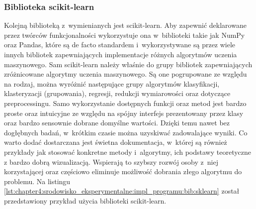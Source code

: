 \documentclass[../Kamil_Kowalewski_Main.tex]{subfiles}
\begin{document}
{{{            \subsubsection{Biblioteka scikit-learn}
            \label{chapter4:srodowisko_eksperymentalne:impl_programu:bib:sklearn} {
                Kolejną biblioteką z~wymienianych jest scikit-learn\cite{website:sklearn}.
                Aby zapewnić deklarowane przez twórców funkcjonalności wykorzystuje ona
                w~biblioteki takie jak NumPy oraz Pandas, które są de facto standardem
                i~wykorzystywane są przez wiele innych bibliotek zapewniających
                implementacje różnych algorytmów uczenia maszynowego. Sam scikit-learn
                należy właśnie do grupy bibliotek zapewniających zróżnicowane algorytmy
                uczenia maszynowego. Są one pogrupowane ze względu na rodzaj, można
                wyróżnić następujące grupy algorytmów klasyfikacji, klasteryzacji
                (grupowania), regresji, redukcji wymiarowości oraz dotyczące
                preprocessingu. Samo wykorzystanie dostępnych funkcji oraz metod jest
                bardzo proste oraz intuicyjne ze względu na spójny interfejs
                prezentowany przez klasy oraz bardzo sensownie dobrane domyślne
                wartości. Dzięki temu nawet bez dogłębnych badań, w~krótkim czasie można
                uzyskiwać zadowalające wyniki. Co warto dodać dostarczana jest świetna
                dokumentacja, w~której są również przykłady jak stosować konkretne
                metody i~algorytmy, ich podstawy teoretyczne z bardzo dobrą
                wizualizacją. Wspierają to szybszy rozwój osoby z~niej korzystającej oraz
                częściowo eliminuje możliwość dobrania złego algorytmu do problemu. Na
                listingu
                \ref{lst:chapter4:srodowisko_eksperymentalne:impl_programu:bib:sklearn}
                został przedstawiony przykład użycia biblioteki scikit-learn.

            }

}}}
\end{document}
